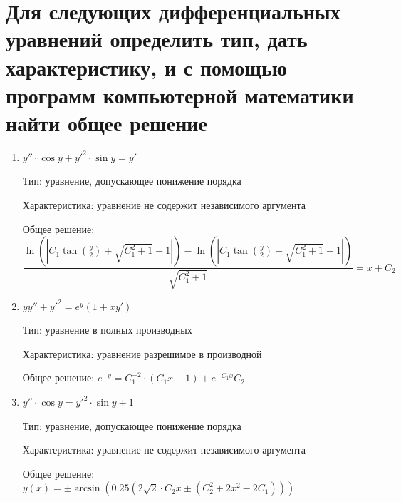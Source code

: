 \documentclass[14pt, a4paper]{extarticle}
\begin{document}
		\section{Для следующих дифференциальных уравнений определить тип, дать характеристику, и с помощью программ компьютерной математики найти общее решение}
			\begin{enumerate}
				\item \(y'' \cdot \cos y + y'^2 \cdot \sin y = y'\)
				
					Тип: уравнение,  допускающее понижение порядка
					
					Характеристика: уравнение не содержит независимого аргумента
					
					Общее решение: \[ \dfrac{\ln\left(\left|C_1\tan\left(\frac{y}{2}\right)+\sqrt{C_1^2+1}-1\right|\right)-\ln\left(\left|C_1\tan\left(\frac{y}{2}\right)-\sqrt{C_1^2+1}-1\right|\right)}{\sqrt{C_1^2+1}} = x + C_2\]
					
				\item \(yy'' + y'^2 = e^y(1+xy')\)
				
					Тип:  уравнение в полных производных
				
					Характеристика: уравнение разрешимое в производной
				
					Общее решение: \(e^{-y} = C_1^{-2} \cdot (C_1x - 1) + e^{-C_1x}C_2\)
					
				\item \(y'' \cdot \cos y = y'^2 \cdot \sin y + 1\)
				
					Тип: уравнение,  допускающее понижение порядка
					
					Характеристика: уравнение не содержит независимого аргумента
				
					Общее решение: \(y(x) = \pm \arcsin\left(0.25\left(2\sqrt{2} \cdot C_2x\pm \left(C_2^2 + 2x^2 - 2C_1\right)\right)\right)\)
			\end{enumerate}
\end{document}
